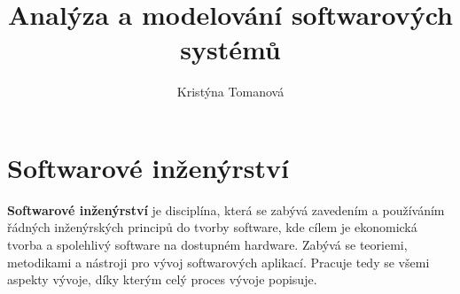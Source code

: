 \documentclass[11pt,a4paper]{book}   %
\author{Kristýna Tomanová}
\title{Analýza a modelování softwarových systémů}
\theoremstyle{definition}
\begin{document}
\chapter{Softwarové inženýrství}
\textbf{Softwarové inženýrství} je disciplína, která se zabývá zavedením a používáním řádných inženýrských principů do tvorby software, kde cílem je ekonomická tvorba a spolehlivý software na dostupném hardware. Zabývá se teoriemi, metodikami a nástroji pro vývoj softwarových aplikací. Pracuje tedy se všemi aspekty vývoje, díky kterým celý proces vývoje popisuje.
\end{document}
